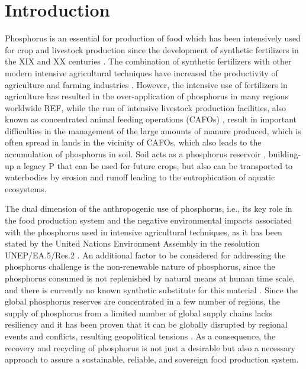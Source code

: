 \documentclass[authoryear]{elsarticle}
\begin{document}

\section{Introduction}
Phosphorus is an essential for production of food which has been intensively used for crop and livestock production since the development of synthetic fertilizers in the XIX and XX centuries \citep{Kausar19}. The combination of synthetic fertilizers with other modern intensive agricultural techniques have increased the productivity of agriculture and farming industries \citep{pingali2012green}.
However, the intensive use of fertilizers in agriculture has resulted in the over-application of phosphorus in many regions worldwide REF, while the run of intensive livestock production facilities, also known as concentrated animal feeding operations (CAFOs) \citep{animal_unit_definition}, result in important difficulties in the management of the large amounts of manure produced, which is often spread in lands in the vicinity of CAFOs, which also leads to the accumulation of phosphorus in soil. Soil acts as a phosphorus reservoir \citep{ehlert2003potential}, building-up a legacy P that can be used for future crops, but also can be transported to waterbodies by erosion and runoff leading to the eutrophication of aquatic ecosystems.

The dual dimension of the anthropogenic use of phosphorus, i.e., its key role in the food production system and the negative environmental impacts associated with the phosphorus used in intensive agricultural techniques, as it has been stated by the United Nations Environment Assembly in the resolution UNEP/EA.5/Res.2 \citep{UN_Phosphorus}. An additional factor to be considered for addressing the phosphorus challenge is the non-renewable nature of phosphorus, since the phosphorus consumed is not replenished by natural means at human time scale, and there is currently no known synthetic substitute for this material \citep{cordell2009story}. Since the global phosphorus reserves are concentrated in a few number of regions, the supply of phosphorus from a limited number of global supply chains lacks resiliency and it has been proven that it can be globally disrupted by regional events and conflicts, resulting geopolitical tensions \citep{FAO_UkraineWar}. As a consequence, the recovery and recycling of phosphorus is not just a desirable but also a necessary approach to assure a sustainable, reliable, and sovereign food production system. 
\end{document}
